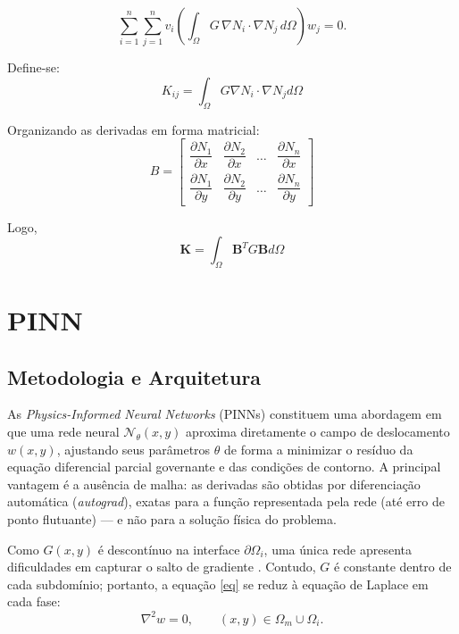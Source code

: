 \documentclass[brazil]{TCAM} %
\begin{document}
\begin{equation*}
\sum_{i=1}^{n}
\sum_{j=1}^{n}
v_i
\left(
\int_{\Omega}
G\,\nabla N_i\cdot\nabla N_j
\, d\Omega
\right)
w_j
=0.
\end{equation*}

Define-se:
\begin{equation*}
    K_{ij} = \int_{\Omega} G \nabla N_{i} \cdot \nabla N_j d \Omega
\end{equation*}

Organizando as derivadas em forma matricial:
\[
B=
\begin{bmatrix}
\dfrac{\partial N_1}{\partial x} &
\dfrac{\partial N_2}{\partial x} &
\dots &
\dfrac{\partial N_n}{\partial x}
\\[3mm]
\dfrac{\partial N_1}{\partial y} &
\dfrac{\partial N_2}{\partial y} &
\dots &
\dfrac{\partial N_n}{\partial y}
\end{bmatrix}
\]

Logo,
$$\mathbf{K}=\int_{\Omega}\mathbf{B}^TG\mathbf{B} d\Omega$$

\section{PINN}

\subsection{Metodologia e Arquitetura}

As \textit{Physics-Informed Neural Networks} (PINNs) constituem uma abordagem em
que uma rede neural $\mathcal{N}_\theta(x,y)$ aproxima diretamente o campo de
deslocamento $w(x,y)$, ajustando seus parâmetros $\theta$ de forma a minimizar o
resíduo da equação diferencial parcial governante e das condições de contorno. A principal vantagem é a ausência de malha: as derivadas
são obtidas por diferenciação automática (\textit{autograd}), exatas para a função
representada pela rede (até erro de ponto flutuante) --- e não para a solução física
do problema.

Como $G(x,y)$ é descontínuo na interface $\partial\Omega_i$, uma única rede
apresenta dificuldades em capturar o salto de gradiente \cite{wu2023convergence,tseng2023cusp}. Contudo, $G$ é constante
dentro de cada subdomínio; portanto, a equação \eqref{eq} se reduz à equação de
Laplace em cada fase:
\begin{equation}
    \nabla^2 w = 0, \qquad (x,y) \in \Omega_m \cup \Omega_i.
\end{equation}
\end{document}
